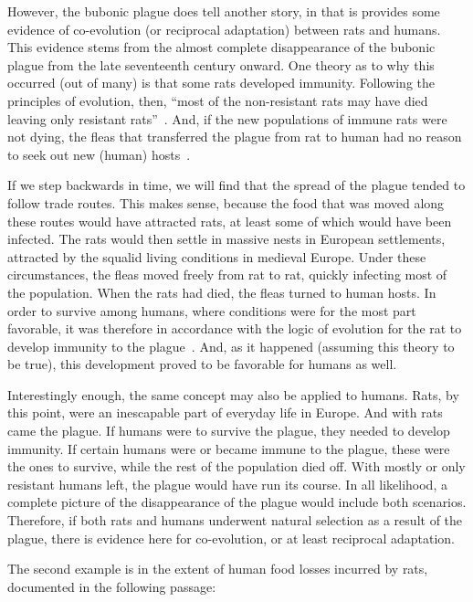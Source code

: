 \documentclass[12pt]{article}
\begin{document}
However, the bubonic plague does tell another story, in that is provides some evidence of co-evolution (or reciprocal adaptation) between rats and humans. This evidence stems from the almost complete disappearance of the bubonic plague from the late seventeenth century onward. One theory as to why this occurred (out of many) is that some rats developed immunity. Following the principles of evolution, then, ``most of the non-resistant rats may have died leaving only resistant rats''~\cite{Appleby1980, ONeill}. And, if the new populations of immune rats were not dying, the fleas that transferred the plague from rat to human had no reason to seek out new (human) hosts~\cite{ONeill}.

If we step backwards in time, we will find that the spread of the plague tended to follow trade routes. This makes sense, because the food that was moved along these routes would have attracted rats, at least some of which would have been infected. The rats would then settle in massive nests in European settlements, attracted by the squalid living conditions in medieval Europe. Under these circumstances, the fleas moved freely from rat to rat, quickly infecting most of the population. When the rats had died, the fleas turned to human hosts. In order to survive among humans, where conditions were for the most part favorable, it was therefore in accordance with the logic of evolution for the rat to develop immunity to the plague~\cite{ONeill}. And, as it happened (assuming this theory to be true), this development proved to be favorable for humans as well.

Interestingly enough, the same concept may also be applied to humans. Rats, by this point, were an inescapable part of everyday life in Europe. And with rats came the plague. If humans were to survive the plague, they needed to develop immunity. If certain humans were or became immune to the plague, these were the ones to survive, while the rest of the population died off. With mostly or only resistant humans left, the plague would have run its course. In all likelihood, a complete picture of the disappearance of the plague would include both scenarios. Therefore, if both rats and humans underwent natural selection as a result of the plague, there is evidence here for co-evolution, or at least reciprocal adaptation.

The second example is in the extent of human food losses incurred by rats, documented in the following passage:
\end{document}
